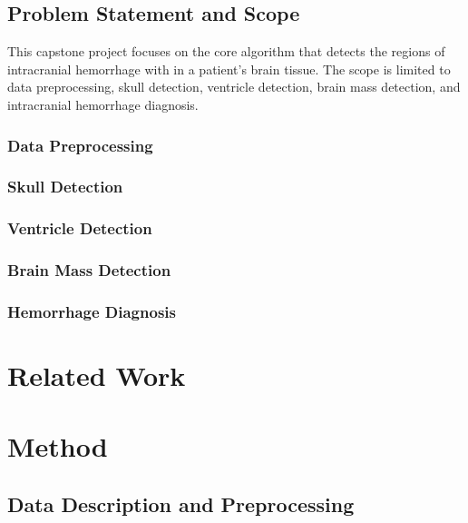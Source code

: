 \documentclass [11pt, proquest] {uwthesis}[2020/02/24]
\begin{document}
\section{Problem Statement and Scope}
This capstone project focuses on the core algorithm that detects the regions of intracranial
hemorrhage with in a patient's brain tissue. The scope is limited to data preprocessing, skull detection,
ventricle detection, brain mass detection, and intracranial hemorrhage diagnosis.

\subsection{Data Preprocessing}





\subsection{Skull Detection}


\subsection{Ventricle Detection}


\subsection{Brain Mass Detection}



\subsection{Hemorrhage Diagnosis}





\chapter {Related Work}






\chapter {Method}

\section{Data Description and Preprocessing}
\end{document}
